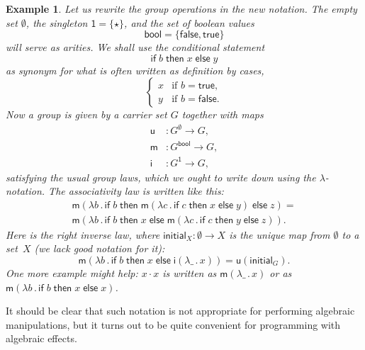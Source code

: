 \documentclass{amsart}
\newcommand{\set}[1]{\{#1\}} %
\newcommand{\lam}[1]{\lambda #1 \,.\,}
\newcommand{\one}{\mathsf{1}} %
\newcommand{\bool}{\mathsf{bool}} %
\newcommand{\true}{\mathsf{true}}
\newcommand{\false}{\mathsf{false}}
\newcommand{\cond}[3]{\mathsf{if}\;#1\;\mathsf{then}\;#2\;\mathsf{else}\;#3}
\newtheorem{example}[definition]{Example}
\begin{document}
\begin{example}
  Let us rewrite the group operations in the new notation. The empty set
  $\emptyset$, the singleton $\one = \set{\star}$, and the set of boolean values
  \begin{equation*}
    \bool = \set{\false, \true}
  \end{equation*}
  will serve as arities. We shall use the conditional statement
  \begin{equation*}
    \cond{b}{x}{y}
  \end{equation*}
  as synonym for what is often written as definition by cases,
  \begin{equation*}
  \begin{cases}
      x & \text{if $b = \true$,}\\
      y & \text{if $b = \false$.}
    \end{cases}
  \end{equation*}
  Now a group is given by a carrier set $G$ together with maps
  \begin{align*}
    \mathsf{u} &: G^\emptyset \to G,\\
    \mathsf{m} &: G^\bool \to G,\\
    \mathsf{i} &: G^\one \to G,
  \end{align*}
  satisfying the usual group laws, which we ought to write down using the
  $\lambda$-notation. The associativity law is written like this:
  \begin{multline*}
    \mathsf{m}(\lam{b} \cond{b}{\mathsf{m}(\lam{c}\cond{c}{x}{y})}{z}) = \\
    \mathsf{m}(\lam{b} \cond{b}{x}{\mathsf{m}(\lam{c} \cond{c}{y}{z})}).
  \end{multline*}
  Here is the right inverse law, where $\mathsf{initial}_X : \emptyset \to X$ is
  the unique map from $\emptyset$ to a set~$X$ (we lack good notation for it):
  \begin{equation*}
    \mathsf{m}(\lam{b} \cond{b}{x}{\mathsf{i}(\lam{\_}{x})}) =
    \mathsf{u}(\mathsf{initial}_G).
  \end{equation*}
  One more example might help: $x \cdot x$ is written as $\mathsf{m}(\lam{\_} x)$ or as
  $\mathsf{m}(\lam{b} \cond{b}{x}{x})$.
\end{example}

It should be clear that such notation is not appropriate for performing
algebraic manipulations, but it turns out to be quite convenient for programming
with algebraic effects.
\end{document}
